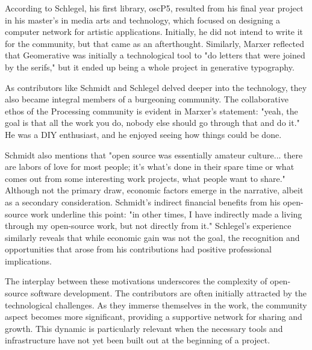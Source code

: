 According to Schlegel, his first library, oscP5, resulted from his final year project in his master's in media arts and technology, which focused on designing a computer network for artistic applications. Initially, he did not intend to write it for the community, but that came as an afterthought. Similarly, Marxer reflected that Geomerative was initially a technological tool to "do letters that were joined by the serifs," but it ended up being a whole project in generative typography.

As contributors like Schmidt and Schlegel delved deeper into the technology, they also became integral members of a burgeoning community. The collaborative ethos of the Processing community is evident in Marxer's statement: "yeah, the goal is that all the work you do, nobody else should go through that and do it." He was a DIY enthusiast, and he enjoyed seeing how things could be done. 

Schmidt also mentions that "open source was essentially amateur culture... there are labors of love for most people; it's what's done in their spare time or what comes out from some interesting work projects, what people want to share." Although not the primary draw, economic factors emerge in the narrative, albeit as a secondary consideration. Schmidt's indirect financial benefits from his open-source work underline this point: "in other times, I have indirectly made a living through my open-source work, but not directly from it." Schlegel's experience similarly reveals that while economic gain was not the goal, the recognition and opportunities that arose from his contributions had positive professional implications.

The interplay between these motivations underscores the complexity of open-source software development. The contributors are often initially attracted by the technological challenges. As they immerse themselves in the work, the community aspect becomes more significant, providing a supportive network for sharing and growth. This dynamic is particularly relevant when the necessary tools and infrastructure have not yet been built out at the beginning of a project.


